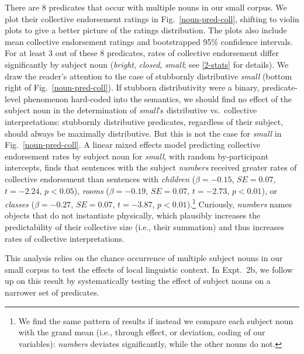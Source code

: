 \documentclass[preprint,12pt,authoryear,titlepage]{elsarticle}
\newcommand{\ndg}[1]{\textcolor{Green}{[ndg: #1]}}
\newcommand{\gcs}[1]{\textcolor{blue}{[gcs: #1]}}
\begin{document}
There are 8 predicates that occur with multiple nouns in our small corpus. We plot their collective endorsement ratings in Fig.~\ref{noun-pred-coll}, shifting to violin plots to give a better picture of the ratings distribution. The plots also include mean collective endorsement ratings and bootstrapped 95\% confidence intervals.
%
%
For at least 3 out of these 8 predicates, rates of collective endorsement differ significantly by subject noun (\emph{bright}, \emph{closed}, \emph{small}; see \ref{2-stats} for details). We draw the reader's attention to the case of stubbornly distributive \emph{small} (bottom right of Fig.~\ref{noun-pred-coll}). 
If stubborn distributivity were a binary, predicate-level phenomenon hard-coded into the semantics, we should find no effect of the subject noun in the determination of \emph{small}'s distributive vs.~collective interpretations: stubbornly distributive predicates, regardless of their subject, should always be maximally distributive. But this is not the case for \emph{small} in Fig.~\ref{noun-pred-coll}. 
A linear mixed effects model predicting collective endorsement rates by subject noun for \emph{small}, with random by-participant intercepts, finds that sentences with the subject \emph{numbers} received greater rates of collective endorsement than sentences with \emph{children} ($\beta=-0.15$, $SE=0.07$, $t=-2.24$, $p<0.05$), \emph{rooms} ($\beta=-0.19$, $SE=0.07$, $t=-2.73$, $p<0.01$), or \emph{classes} ($\beta=-0.27$, $SE=0.07$, $t=-3.87$, $p<0.01$).\footnote{We find the same pattern of results if instead we compare each subject noun with the grand mean (i.e., through effect, or deviation, coding of our variables): \emph{numbers} deviates significantly, while the other nouns do not.} Curiously, \emph{numbers} names objects that do not instantiate physically, which plausibly increases the predictability of their collective size (i.e., their summation) and thus increases rates of collective interpretations.

This analysis relies on the chance occurrence of multiple subject nouns in our small corpus to test the effects of local linguistic context. In Expt.~2b, we follow up on this result by systematically testing the effect of subject nouns on a narrower set of predicates.
\end{document}
